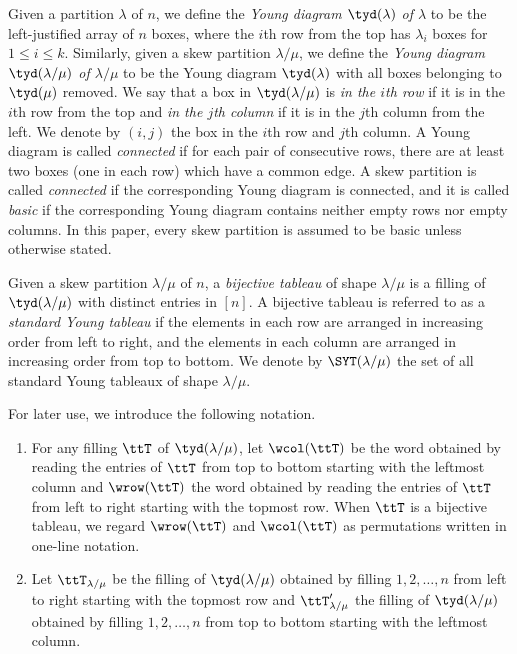 \documentclass[12pt, reqno]{amsart}
\theoremstyle{plain}
\theoremstyle{definition}
\numberwithin{equation}{section}
\numberwithin{figure}{section}
\numberwithin{table}{section}
\begin{document}
Given a partition $\lambda$ of $n$, we define the \emph{Young diagram $\tyd(\lambda)$ of $\lambda$} to be the left-justified array of $n$ boxes, where the $i$th row from the top has $\lambda_i$ boxes for $1 \le i \le k$.
Similarly, given a skew partition $\lambda / \mu$, we define the \emph{Young diagram $\tyd(\lambda / \mu)$ of $\lambda / \mu$} to be the Young diagram $\tyd(\lambda)$ with all boxes belonging to $\tyd(\mu)$ removed.
We say that a box in $\tyd(\lambda/\mu)$ is \emph{in the $i$th row} if it is in the $i$th row from the top and \emph{in the $j$th column} if it is in the $j$th column from the left.
We denote by $(i,j)$ the box in the $i$th row and $j$th column.
A Young diagram is called \emph{connected}
if for each pair of consecutive rows, there are at least two boxes (one in each row) which have a common edge.
A skew partition is called \emph{connected} if the corresponding Young diagram is connected, and it is called \emph{basic} if the corresponding Young diagram contains neither empty rows nor empty columns.
In this paper, every skew partition is assumed to be  basic unless otherwise stated.




Given a skew partition $\lambda/\mu$ of  $n$, a \emph{bijective tableau} of shape $\lambda / \mu$ is a filling of $\tyd(\lambda / \mu)$ with distinct entries in $[n]$.
A bijective tableau is referred to as a \emph{standard Young tableau} if the elements in each row are arranged in increasing order from left to right, and the elements in each column are arranged in increasing order from top to bottom.
We denote by $\SYT(\lambda / \mu)$ the set of all standard Young tableaux of shape $\lambda / \mu$.

For later use, we introduce the following notation.

\begin{enumerate}[label = {\rm (\arabic*)}, leftmargin = 4ex, itemsep = 0.5ex]
\item 
For any filling $\ttT$ of  $\tyd(\lambda/\mu)$, let $\wcol(\ttT)$ be the word obtained by reading the entries of $\ttT$ from top to bottom starting with the leftmost column and $\wrow(\ttT)$ the word obtained by reading the entries of $\ttT$ from left to right starting with the topmost row.
When $\ttT$ is a bijective tableau, we regard $\wrow(\ttT)$ and $\wcol(\ttT)$ 
as permutations written in one-line notation.


\item 
Let $\ttT_{\lambda/\mu}$ be the filling of $\tyd(\lambda/\mu)$ obtained by filling $1, 2, \ldots, n$ from left to right starting with the topmost row and $\ttT'_{\lambda/\mu}$  the filling of $\tyd(\lambda/\mu)$ obtained by filling $1, 2, \ldots, n$ from top to bottom starting with the leftmost column.
\end{enumerate}
\end{document}
